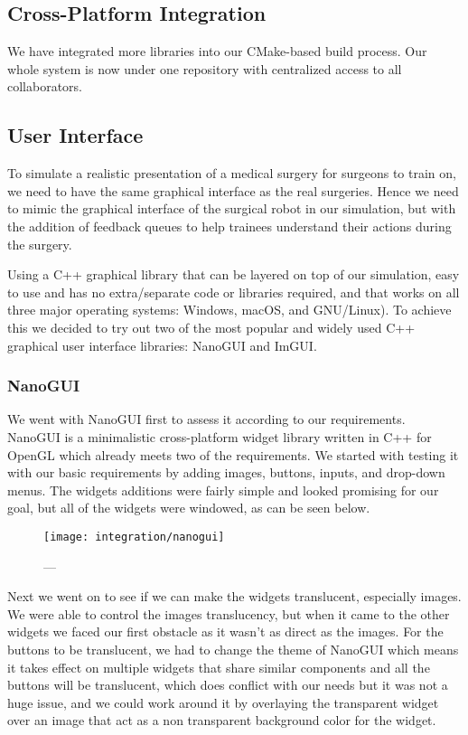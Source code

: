 \subsection{Cross-Platform Integration}\label{sec:cross}

We have integrated more libraries into our CMake-based build process. Our whole system is now under one repository with centralized access to all collaborators.

\subsection{User Interface}\label{sec:console}
To simulate a realistic presentation of a medical surgery for surgeons to train on, we need to have the same graphical interface as the real surgeries. Hence we need to mimic the graphical interface of the surgical robot in our simulation, but with the addition of feedback queues to help trainees understand their actions during the surgery.

Using a C++ graphical library that can be layered on top of our simulation, easy to use and has no extra/separate code or libraries required, and that works on all three major operating systems: Windows, macOS, and GNU/Linux). To achieve this we decided to try out two of the most popular and widely used C++ graphical user interface libraries: NanoGUI and ImGUI.

\subsubsection{NanoGUI}\label{ssec:nanogui}
We went with NanoGUI first to assess it according to our requirements. NanoGUI is a minimalistic cross-platform widget library written in C++ for OpenGL which already meets two of the requirements. We started with testing it with our basic requirements by adding images, buttons, inputs, and drop-down menus. The widgets additions were fairly simple and looked promising for our goal, but all of the widgets were windowed, as can be seen below.

\begin{figure}
  \centering%
  \texttt{[image: integration/nanogui]}
  \caption{---}\label{fig:}
\end{figure}

Next we went on to see if we can make the widgets translucent, especially images. We were able to control the images translucency, but when it came to the other widgets we faced our first obstacle as it wasn’t as direct as the images. For the buttons to be translucent, we had to change the theme of NanoGUI which means it takes effect on multiple widgets that share similar components and all the buttons will be translucent, which does conflict with our needs but it was not a huge issue, and we could work around it by overlaying the transparent widget over an image that act as a non transparent background color for the widget.

